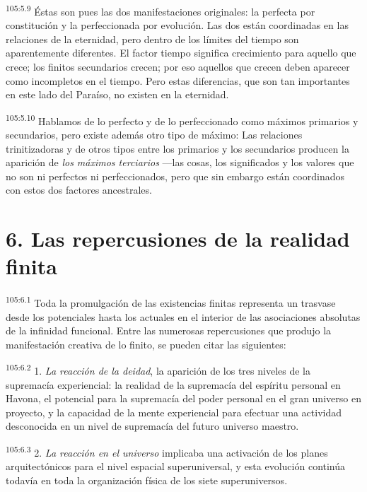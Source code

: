 \documentclass[twoside, 11pt]{book}
\begin{document}
\par
\textsuperscript{105:5.9} Éstas son pues las dos manifestaciones originales: la perfecta por constitución y la perfeccionada por evolución. Las dos están coordinadas en las relaciones de la eternidad, pero dentro de los límites del tiempo son aparentemente diferentes. El factor tiempo significa crecimiento para aquello que crece; los finitos secundarios crecen; por eso aquellos que crecen deben aparecer como incompletos en el tiempo. Pero estas diferencias, que son tan importantes en este lado del Paraíso, no existen en la eternidad.

\par
\textsuperscript{105:5.10} Hablamos de lo perfecto y de lo perfeccionado como máximos primarios y secundarios, pero existe además otro tipo de máximo: Las relaciones trinitizadoras y de otros tipos entre los primarios y los secundarios producen la aparición de \textit{los máximos terciarios} ---las cosas, los significados y los valores que no son ni perfectos ni perfeccionados, pero que sin embargo están coordinados con estos dos factores ancestrales.

\section*{6. Las repercusiones de la realidad finita}
\par
\textsuperscript{105:6.1} Toda la promulgación de las existencias finitas representa un trasvase desde los potenciales hasta los actuales en el interior de las asociaciones absolutas de la infinidad funcional. Entre las numerosas repercusiones que produjo la manifestación creativa de lo finito, se pueden citar las siguientes:

\par
\textsuperscript{105:6.2} 1. \textit{La reacción de la deidad}, la aparición de los tres niveles de la supremacía experiencial: la realidad de la supremacía del espíritu personal en Havona, el potencial para la supremacía del poder personal en el gran universo en proyecto, y la capacidad de la mente experiencial para efectuar una actividad desconocida en un nivel de supremacía del futuro universo maestro.

\par
\textsuperscript{105:6.3} 2. \textit{La reacción en el universo} implicaba una activación de los planes arquitectónicos para el nivel espacial superuniversal, y esta evolución continúa todavía en toda la organización física de los siete superuniversos.
\end{document}
